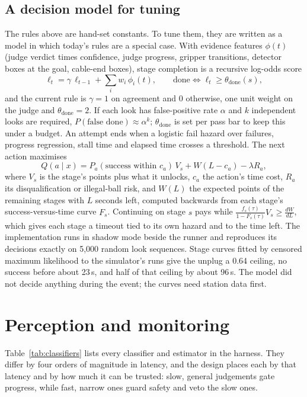 \documentclass[10pt]{article}
\begin{document}
\subsection{A decision model for tuning}
\label{sec:decision}
The rules above are hand-set constants. To tune them, they are written as a model in which today's rules are a special
case. With evidence features $\phi(t)$ (judge verdict times confidence, judge progress, gripper transitions, detector boxes
at the goal, cable-end boxes), stage completion is a recursive log-odds score
\begin{equation}
  \ell_t = \gamma\,\ell_{t-1} + \textstyle\sum_i w_i\,\phi_i(t), \qquad \text{done} \iff \ell_t \ge \theta_{\text{done}}(s),
\end{equation}
and the current rule is $\gamma=1$ on agreement and 0 otherwise, one unit weight on the judge and $\theta_{\text{done}}=2$.
If each look has false-positive rate $\alpha$ and $k$ independent looks are required, $P(\text{false done})\approx\alpha^k$;
$\theta_{\text{done}}$ is set per pass bar to keep this under a budget. An attempt ends when a logistic fail hazard over
failures, progress regression, stall time and elapsed time crosses a threshold. The next action maximises
\begin{equation}
  Q(a\mid x) = P_a(\text{success within } c_a)\,V_s + W(L - c_a) - \lambda R_a,
\end{equation}
where $V_s$ is the stage's points plus what it unlocks, $c_a$ the action's time cost, $R_a$ its disqualification or
illegal-ball risk, and $W(L)$ the expected points of the remaining stages with $L$ seconds left, computed backwards from each
stage's success-versus-time curve $F_s$. Continuing on stage $s$ pays while $\frac{f_s(\tau)}{1-F_s(\tau)}V_s \ge
\frac{dW}{dL}$, which gives each stage a timeout tied to its own hazard and to the time left. The implementation runs in shadow
mode beside the runner and reproduces its decisions exactly on 5{,}000 random look sequences. Stage curves fitted by censored
maximum likelihood to the simulator's runs give the unplug a 0.64 ceiling, no success before about 23\,s, and half of that ceiling by about 96\,s. The
model did not decide anything during the event; the curves need station data first.

\section{Perception and monitoring}
\label{sec:perception}

Table~\ref{tab:classifiers} lists every classifier and estimator in the harness. They differ by four orders of magnitude in
latency, and the design places each by that latency and by how much it can be trusted: slow, general judgements gate progress,
while fast, narrow ones guard safety and veto the slow ones.
\end{document}
